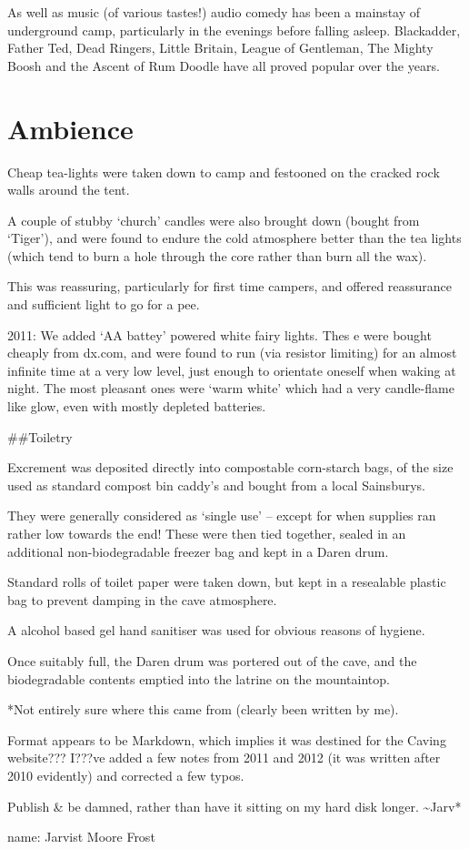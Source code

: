 As well as music (of various tastes!) audio comedy has been a mainstay
of underground camp, particularly in the evenings before falling asleep.
Blackadder, Father Ted, Dead Ringers, Little Britain, League of
Gentleman, The Mighty Boosh and the Ascent of Rum Doodle have all proved
popular over the years.


\section{Ambience}

Cheap tea-lights were taken down to camp and festooned on the cracked
rock walls around the tent.

A couple of stubby `church' candles were also brought down (bought from
`Tiger'), and were found to endure the cold atmosphere better than the
tea lights (which tend to burn a hole through the core rather than burn
all the wax).

This was reassuring, particularly for first time campers, and offered
reassurance and sufficient light to go for a pee.

2011: We added `AA battey' powered white fairy lights. Thes e were
bought cheaply from dx.com, and were found to run (via resistor
limiting) for an almost infinite time at a very low level, just enough
to orientate oneself when waking at night. The most pleasant ones were
`warm white' which had a very candle-flame like glow, even with mostly
depleted batteries.

\#\#Toiletry

Excrement was deposited directly into compostable corn-starch bags, of
the size used as standard compost bin caddy's and bought from a local
Sainsburys.

They were generally considered as `single use' -- except for when
supplies ran rather low towards the end! These were then tied together,
sealed in an additional non-biodegradable freezer bag and kept in a
Daren drum.

Standard rolls of toilet paper were taken down, but kept in a resealable
plastic bag to prevent damping in the cave atmosphere.

A alcohol based gel hand sanitiser was used for obvious reasons of
hygiene.

Once suitably full, the Daren drum was portered out of the cave, and the
biodegradable contents emptied into the latrine on the mountaintop.

*Not entirely sure where this came from (clearly been written by me).

Format appears to be Markdown, which implies it was destined for the
Caving website??? I???ve added a few notes from 2011 and 2012 (it was
written after 2010 evidently) and corrected a few typos.

Publish \& be damned, rather than have it sitting on my hard disk
longer. \textasciitilde{}Jarv*

name: Jarvist Moore Frost
